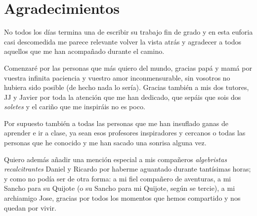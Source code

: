 

\chapter*{Agradecimientos}

No todos los días termina una de escribir su trabajo fin de grado y en esta euforia casi descomedida me parece relevante volver la vista atrás y agradecer a todos aquellos que me han acompañado durante el camino. 

Comenzaré por 
las personas que más quiero del mundo, gracias papá y mamá por vuestra infinita paciencia y vuestro amor inconmensurable, sin vosotros no hubiera sido posible (de hecho nada lo sería). 
Gracias también a mis dos tutores, JJ y Javier por toda la atención que me han dedicado, que sepáis que sois dos \textit{soletes} y el cariño que me inspiráis no es poco.

Por supuesto también a todas las personas que me han insuflado ganas de aprender e ir a clase, ya sean esos profesores inspiradores y cercanos o 
todas las personas que he conocido y me han sacado una sonrisa alguna vez. 

Quiero además añadir una mención especial a mis compañeros \textit{algebristas recalcitrantes} Daniel y Ricardo por haberme aguantado durante tantísimas horas; y como no podía ser de otra forma: a mi fiel compañero de aventuras, a mi Sancho para su Quijote (o su Sancho para mi Quijote, según se tercie), a mi archiamigo Jose, gracias por todos los momentos que hemos compartido y nos quedan por vivir. 


\endinput
